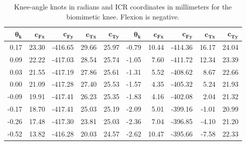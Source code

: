 \documentclass[utf8]{frontiers_suppmat} %
\renewcommand{\arraystretch}{1.5}  %
\begin{document}
\begin{table}[htbp]
\centering\small
\caption{Knee-angle knots in radians and ICR coordinates in millimeters for the biomimetic knee. Flexion is negative.}
\label{tab:knee_frame_knots}
\begingroup\renewcommand{\arraystretch}{1.02}\setlength{\tabcolsep}{4pt}
\begin{tabular}{@{}rrrrr@{\hspace{6mm}}rrrrr@{}}
\toprule
$\boldsymbol{\theta_{\mathbf k}}$ & $\boldsymbol{c_{Fx}}$ & $\boldsymbol{c_{Fy}}$ & $\boldsymbol{c_{Tx}}$ & $\boldsymbol{c_{Ty}}$ &
$\boldsymbol{\theta_{\mathbf k}}$ & $\boldsymbol{c_{Fx}}$ & $\boldsymbol{c_{Fy}}$ & $\boldsymbol{c_{Tx}}$ & $\boldsymbol{c_{Ty}}$\\
\midrule
0.17 & 23.30 & -416.65 & 29.66 & 25.97 & -0.79 & 10.44 & -414.36 & 16.17 & 24.04 \\
0.09 & 22.22 & -417.03 & 28.54 & 25.74 & -1.05 & 7.60 & -411.72 & 12.34 & 23.39 \\
0.03 & 21.55 & -417.19 & 27.86 & 25.61 & -1.31 & 5.52 & -408.62 & 8.67 & 22.66 \\
0.00 & 21.09 & -417.28 & 27.40 & 25.53 & -1.57 & 4.35 & -405.32 & 5.24 & 21.93 \\
-0.09 & 19.91 & -417.41 & 26.23 & 25.35 & -1.83 & 4.16 & -402.08 & 2.04 & 21.32 \\
-0.17 & 18.70 & -417.41 & 25.03 & 25.19 & -2.09 & 5.01 & -399.16 & -1.01 & 20.99 \\
-0.26 & 17.48 & -417.30 & 23.81 & 25.03 & -2.36 & 7.04 & -396.85 & -4.10 & 21.20 \\
-0.52 & 13.82 & -416.28 & 20.03 & 24.57 & -2.62 & 10.47 & -395.66 & -7.58 & 22.33 \\
\bottomrule
\end{tabular}\endgroup
\end{table}
\end{document}
